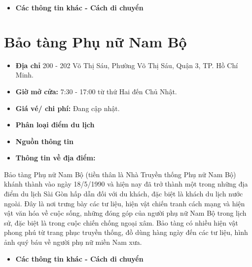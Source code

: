 \documentclass{article}
\begin{document}
\begin{itemize}
    \item{\textbf{Các thông tin khác - Cách di chuyển}}
\end{itemize}

\section{Bảo tàng Phụ nữ Nam Bộ}
\begin{itemize}
    \item{\textbf{Địa chỉ}} 200 - 202 Võ Thị Sáu, Phường Võ Thị Sáu, Quận 3, TP. Hồ Chí Minh.
    \item{\textbf{Giờ mở cửa:}} 7:30 - 17:00 từ thứ Hai đến Chủ Nhật.
    \item{\textbf{Giá vé/ chi phí:}} Đang cập nhật.
    \item{\textbf{Phân loại điểm du lịch} }
    \item{\textbf{Nguồn thông tin}}
    \item{\textbf{Thông tin về địa điểm:}}
\end{itemize}
Bảo tàng Phụ nữ Nam Bộ (tiền thân là Nhà Truyền thống Phụ nữ Nam Bộ) khánh thành vào ngày 18/5/1990 và hiện nay đã trở thành một trong những địa điểm du lịch Sài Gòn hấp dẫn đối với du khách, đặc biệt là khách du lịch nước ngoài. Đây là nơi trưng bày các tư liệu, hiện vật chiến tranh cách mạng và hiện vật văn hóa về cuộc sống, những đóng góp của người phụ nữ Nam Bộ trong lịch sử, đặc biệt là trong cuộc chiến chống ngoại xâm. Bảo tàng có nhiều hiện vật phong phú từ trang phục truyền thống, đồ dùng hàng ngày đến các tư liệu, hình ảnh quý báu về người phụ nữ miền Nam xưa.

\begin{itemize}
    \item{\textbf{Các thông tin khác - Cách di chuyển}}
\end{itemize}
\end{document}
